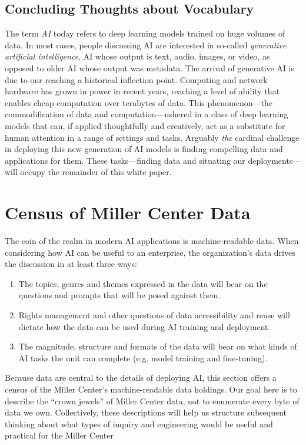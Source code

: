 \documentclass[12pt, oneside]{article}   	%
\begin{document}
 


\subsection{Concluding Thoughts about Vocabulary}\label{section.definitions.closing}
The term \emph{AI} today refers to deep learning models trained on huge volumes of data.  In most cases, people discussing AI are interested in so-called \emph{generative artificial intelligence}, AI whose output is text, audio, images, or video, as opposed to older AI whose output was  metadata.  The arrival of generative AI is due to our reaching a historical inflection point.  Computing and network hardware has grown in power in recent years, reaching a level of ability that enables cheap computation over terabytes of data.  This phenomenon---the commodification of data and computation---ushered in a class of deep learning models that can, if applied thoughtfully and creatively, act as a substitute for human attention in a range of settings and tasks.  Arguably \emph{the} cardinal challenge in deploying this new generation of AI models is finding compelling data and applications for them.  These tasks---finding data and situating our deployments---will occupy the remainder of this white paper.


\section{Census of Miller Center Data}\label{section.data}
The coin of the realm in modern AI applications is machine-readable data.  When considering how AI can be useful to an enterprise, the organization’s data drives the discussion in at least three ways:
\begin{enumerate}
\item The topics, genres and themes expressed in the data will bear on the questions and prompts that will be posed against them.
\item Rights management and other questions of data accessibility and reuse will dictate how the data can be used during AI training and deployment.
\item The magnitude, structure and formats of the data will bear on what kinds of AI tasks the unit can complete (e.g. model training and fine-tuning).
\end{enumerate}
Because data are central to the details of deploying AI, this section offers a census of the Miller Center’s machine-readable data holdings.  Our goal here is to describe the “crown jewels” of Miller Center data, not to enumerate every byte of data we own.  Collectively, these descriptions will help us structure subsequent thinking about what types of inquiry and engineering would be useful and practical for the Miller Center
\end{document}
